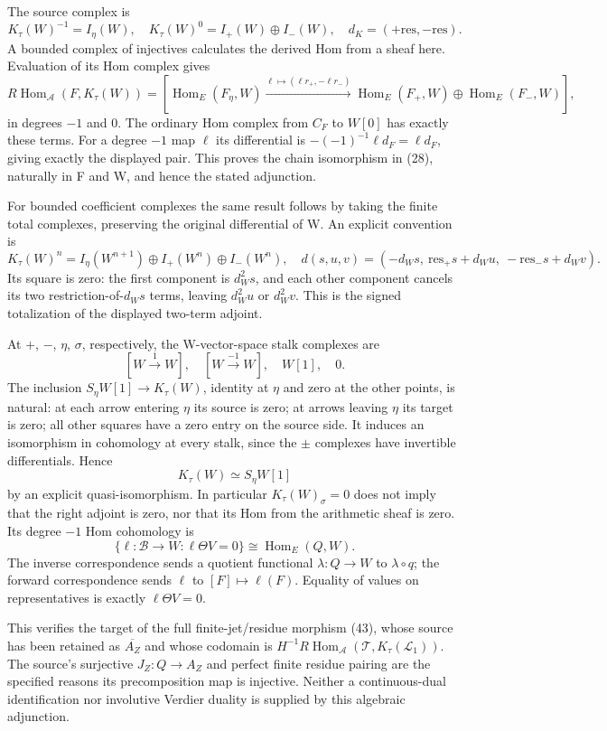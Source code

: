 \documentclass[10pt,a4paper,oneside]{report}
\begin{document}
The source complex is \[
K_\tau(W)^{-1}=I_\eta(W),\quad
K_\tau(W)^0=I_+(W)\oplus I_-(W),\quad
d_K=(+\mathrm{res},-\mathrm{res}).
\] A bounded complex of injectives calculates the derived Hom from a sheaf here. Evaluation of its Hom complex gives \[
R\operatorname{Hom}_{\mathcal A}(F,K_\tau(W))
=\left[\operatorname{Hom}_E(F_\eta,W)
\xrightarrow{\ell\mapsto(\ell r_+,-\ell r_-)}
\operatorname{Hom}_E(F_+,W)\oplus\operatorname{Hom}_E(F_-,W)\right],
\] in degrees \(-1\) and 0. The ordinary Hom complex from \(C_F\) to \(W[0]\) has exactly these terms. For a degree \(-1\) map \(\ell\) its differential is \(-(-1)^{-1}\ell d_F=\ell d_F\), giving exactly the displayed pair. This proves the chain isomorphism in (28), naturally in F and W, and hence the stated adjunction.

For bounded coefficient complexes the same result follows by taking the finite total complexes, preserving the original differential of W. An explicit convention is \[
K_\tau(W)^n=I_\eta(W^{n+1})\oplus I_+(W^n)\oplus I_-(W^n),
\quad d(s,u,v)=(-d_Ws,\ \mathrm{res}_+s+d_Wu,
\ -\mathrm{res}_-s+d_Wv).
\] Its square is zero: the first component is \(d_W^2s\), and each other component cancels its two restriction-of-\(d_Ws\) terms, leaving \(d_W^2u\) or \(d_W^2v\). This is the signed totalization of the displayed two-term adjoint.

At +, \(-\), \(\eta\), \(\sigma\), respectively, the W-vector-space stalk complexes are \[
[W\xrightarrow{1}W],\quad[W\xrightarrow{-1}W],\quad W[1],\quad0.
\] The inclusion \(S_\eta W[1]\to K_\tau(W)\), identity at \(\eta\) and zero at the other points, is natural: at each arrow entering \(\eta\) its source is zero; at arrows leaving \(\eta\) its target is zero; all other squares have a zero entry on the source side. It induces an isomorphism in cohomology at every stalk, since the \(\pm\) complexes have invertible differentials. Hence \[
K_\tau(W)\simeq S_\eta W[1]
\] by an explicit quasi-isomorphism. In particular \(K_\tau(W)_\sigma=0\) does not imply that the right adjoint is zero, nor that its Hom from the arithmetic sheaf is zero. Its degree \(-1\) Hom cohomology is \[
\{\ell:\mathscr B\to W:\ell\Theta V=0\}
\cong\operatorname{Hom}_E(Q,W).
\] The inverse correspondence sends a quotient functional \(\lambda:Q\to W\) to \(\lambda\circ q\); the forward correspondence sends \(\ell\) to \([F]\mapsto\ell(F)\). Equality of values on representatives is exactly \(\ell\Theta V=0\).

This verifies the target of the full finite-jet/residue morphism (43), whose source has been retained as \(\overline{A_Z}\) and whose codomain is \(H^{-1}R\operatorname{Hom}_{\mathcal A}(\mathcal T,K_\tau(\mathcal L_1))\). The source's surjective \(J_Z:Q\to A_Z\) and perfect finite residue pairing are the specified reasons its precomposition map is injective. Neither a continuous-dual identification nor involutive Verdier duality is supplied by this algebraic adjunction.
\end{document}
